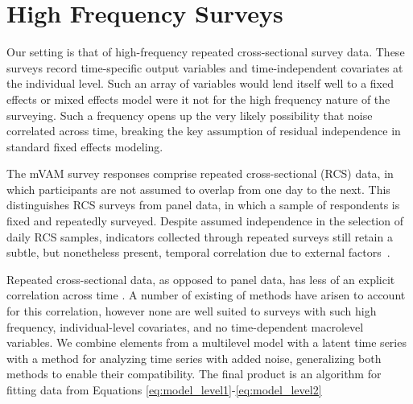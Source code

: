 \section{High Frequency Surveys}



Our setting is that of high-frequency repeated cross-sectional survey data. These surveys record time-specific output variables and time-independent covariates at the individual level. Such an array of variables would lend itself well to a fixed effects or mixed effects model were it not for the high frequency nature of the surveying. Such a frequency opens up the very likely possibility that noise correlated across time, breaking the key assumption of residual independence in standard fixed effects modeling. 

The mVAM survey responses comprise repeated cross-sectional (RCS) data, in which participants are not assumed to overlap from one day to the next. This distinguishes RCS surveys from panel data, in which a sample of respondents is fixed and repeatedly surveyed. Despite assumed independence in the selection of daily RCS samples, indicators collected through repeated surveys still retain a subtle, but nonetheless present, temporal correlation due to external factors~\citep{Lebo}.

Repeated cross-sectional data, as opposed to panel data, has less of an explicit correlation across time \citep{lebo2015repeated}. A number of existing of methods have arisen to account for this correlation, however none are well suited to surveys with such high frequency, individual-level covariates, and no time-dependent macrolevel variables. We combine elements from a multilevel model with a latent time series with a method for analyzing time series with added noise, generalizing both methods to enable their compatibility. The final product is an algorithm for fitting data from Equations \ref{eq:model_level1}-\ref{eq:model_level2}
